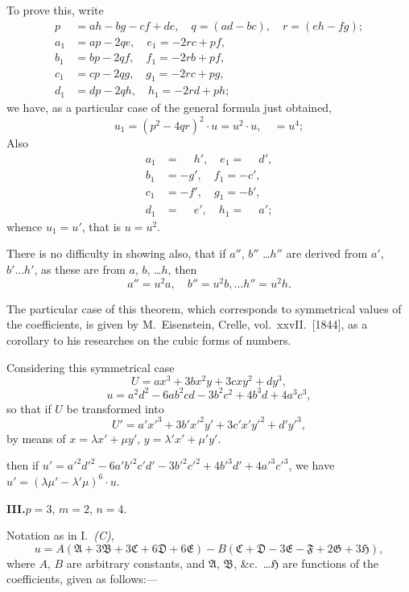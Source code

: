\documentclass[11pt,a4paper]{article}
\theoremstyle{plain}
\theoremstyle{definition}
\theoremstyle{remark}
\begin{document}
To prove this, write
\begin{align*}
p &= ah - bg - cf + de, \quad q = (ad - bc), \quad r = (eh - fg);\\
a_1 &= ap - 2qe, \quad e_1 = -2rc + pf, \\
b_1 &= bp - 2qf, \quad f_1 = -2rb + pf, \\
c_1 &= cp - 2qg, \quad g_1 = -2rc + pg, \\
d_1 &= dp - 2qh, \quad h_1 = -2rd + ph;
\end{align*}
we have, as a particular case of the general formula just obtained,
\[
u_1 = (p^2 - 4qr)^2 \cdot u = u^2 \cdot u, \quad = u^4;
\]
Also
\begin{align*}
a_1 &= \phantom{-}h', \quad e_1 = \phantom{-}d', \\
b_1 &= -g', \quad f_1 = -c', \\
c_1 &= -f', \quad g_1 = -b', \\
d_1 &= \phantom{-}e', \quad h_1 = \phantom{-}a';
\end{align*}
whence $u_1 = u'$, that is $u = u^2$.

There is no difficulty in showing also, that if $a''$, $b''$ \ldots $h''$ are derived from
$a'$, $b' \ldots h'$, as these are from $a$, $b$, \ldots $h$, then
\[
a'' = u^2 a, \quad b'' = u^2 b, \ldots h'' = u^2 h.
\]

The particular case of this theorem, which corresponds to symmetrical values of the
coefficients, is given by M.~Eisenstein, Crelle, vol.~xxvII.\ [1844], as a corollary to his
researches on the cubic forms of numbers.

Considering this symmetrical case
\[
U = ax^3 + 3bx^2y + 3cxy^2 + dy^3,
\]
\[
u = a^2d^2 - 6ab^2cd - 3b^2c^2 + 4b^3d + 4a^3c^3,
\]
so that if $U$ be transformed into
\[
U' = a'x'^3 + 3b'x'^2y' + 3c'x'y'^2 + d'y'^3,
\]
by means of $x = \lambda x' + \mu y'$,
$y = \lambda' x' + \mu' y'$.

then if $u' = a'^2d'^2 - 6a'b'^2c'd' - 3b'^2c'^2 + 4b'^3d' + 4a'^3c'^3$,
we have $u' = (\lambda\mu' - \lambda'\mu)^6 \cdot u$.

\newpage
\textbf{III.}\quad $p=3$, $m=2$, $n=4$.

Notation as in I.\ \textit{(C)},
\[
u = A(\mathfrak{A} + 3\mathfrak{B} + 3\mathfrak{C} + 6\mathfrak{D} + 6\mathfrak{E}) - B(\mathfrak{C} + \mathfrak{D} - 3\mathfrak{E} - \mathfrak{F} + 2\mathfrak{G} + 3\mathfrak{H}),
\]
where $A$, $B$ are arbitrary constants, and $\mathfrak{A}$, $\mathfrak{B}$, \&c.\ \ldots $\mathfrak{H}$ are functions of the coefficients,
given as follows:---
\end{document}
